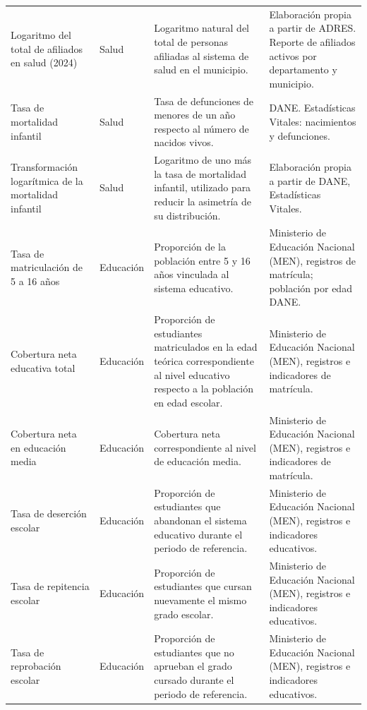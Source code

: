 \begin{longtable}{
>{\raggedright\arraybackslash}p{2.5cm}
>{\raggedright\arraybackslash}p{1.5cm}
>{\raggedright\arraybackslash}p{3.8cm}
>{\raggedright\arraybackslash}p{4.4cm}
}
Logaritmo del total de afiliados en salud (2024)
& Salud
& Logaritmo natural del total de personas afiliadas al sistema de salud en el municipio.
& Elaboración propia a partir de ADRES. Reporte de afiliados activos por departamento y municipio. \\

Tasa de mortalidad infantil
& Salud
& Tasa de defunciones de menores de un año respecto al número de nacidos vivos.
& DANE. Estadísticas Vitales: nacimientos y defunciones. \\

Transformación logarítmica de la mortalidad infantil
& Salud
& Logaritmo de uno más la tasa de mortalidad infantil, utilizado para reducir la asimetría de su distribución.
& Elaboración propia a partir de DANE, Estadísticas Vitales. \\

Tasa de matriculación de 5 a 16 años
& Educación
& Proporción de la población entre 5 y 16 años vinculada al sistema educativo.
& Ministerio de Educación Nacional (MEN), registros de matrícula; población por edad DANE. \\

Cobertura neta educativa total
& Educación
& Proporción de estudiantes matriculados en la edad teórica correspondiente al nivel educativo respecto a la población en edad escolar.
& Ministerio de Educación Nacional (MEN), registros e indicadores de matrícula. \\

Cobertura neta en educación media
& Educación
& Cobertura neta correspondiente al nivel de educación media.
& Ministerio de Educación Nacional (MEN), registros e indicadores de matrícula. \\

Tasa de deserción escolar
& Educación
& Proporción de estudiantes que abandonan el sistema educativo durante el periodo de referencia.
& Ministerio de Educación Nacional (MEN), registros e indicadores educativos. \\

Tasa de repitencia escolar
& Educación
& Proporción de estudiantes que cursan nuevamente el mismo grado escolar.
& Ministerio de Educación Nacional (MEN), registros e indicadores educativos. \\

Tasa de reprobación escolar
& Educación
& Proporción de estudiantes que no aprueban el grado cursado durante el periodo de referencia.
& Ministerio de Educación Nacional (MEN), registros e indicadores educativos. \\


\end{longtable}

